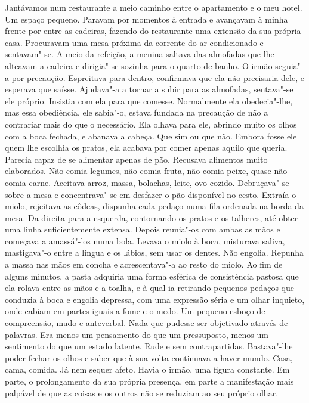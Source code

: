 Jantávamos num restaurante a meio caminho entre o apartamento e o meu
hotel. Um espaço pequeno. Paravam por momentos à entrada e avançavam à
minha frente por entre as cadeiras, fazendo do restaurante uma extensão
da sua própria casa. Procuravam uma mesa próxima da corrente do ar
condicionado e sentavam"-se. A meio da refeição, a menina saltava das
almofadas que lhe alteavam a cadeira e dirigia"-se sozinha para o quarto
de banho. O irmão seguia"-a por precaução. Espreitava para dentro,
confirmava que ela não precisaria dele, e esperava que saísse.
Ajudava"-a a tornar a subir para as almofadas, sentava"-se ele próprio.
Insistia com ela para que comesse. Normalmente ela obedecia"-lhe, mas
essa obediência, ele sabia"-o, estava fundada na precaução de não a
contrariar mais do que o necessário. Ela olhava para ele, abrindo muito
os olhos com a boca fechada, e abanava a cabeça. Que sim ou que não.
Embora fosse ele quem lhe escolhia os pratos, ela acabava por comer
apenas aquilo que queria. Parecia capaz de se alimentar apenas de pão.
Recusava alimentos muito elaborados. Não comia legumes, não comia fruta,
não comia peixe, quase não comia carne. Aceitava arroz, massa, bolachas,
leite, ovo cozido. Debruçava"-se sobre a mesa e concentrava"-se em
desfazer o pão disponível no cesto. Extraía o miolo, rejeitava as
côdeas, dispunha cada pedaço numa fila ordenada na borda da mesa. Da
direita para a esquerda, contornando os pratos e os talheres, até obter
uma linha suficientemente extensa. Depois reunia"-os com ambas as mãos e
começava a amassá"-los numa bola. Levava o miolo à boca, misturava
saliva, mastigava"-o entre a língua e os lábios, sem usar os dentes. Não
engolia. Repunha a massa nas mãos em concha e acrescentava"-a ao resto
do miolo. Ao fim de alguns minutos, a pasta adquiria uma forma esférica
de consistência pastosa que ela rolava entre as mãos e a toalha, e à
qual ia retirando pequenos pedaços que conduzia à boca e engolia
depressa, com uma expressão séria e um olhar inquieto, onde cabiam em
partes iguais a fome e o medo. Um pequeno esboço de compreensão, mudo e
anteverbal. Nada que pudesse ser objetivado através de palavras. Era
menos um pensamento do que um pressuposto, menos um sentimento do que um
estado latente. Rude e sem contrapartidas. Bastava"-lhe poder fechar os
olhos e saber que à sua volta continuava a haver mundo. Casa, cama,
comida. Já nem sequer afeto. Havia o irmão, uma figura constante. Em
parte, o prolongamento da sua própria presença, em parte a manifestação
mais palpável de que as coisas e os outros não se reduziam ao seu
próprio olhar.

